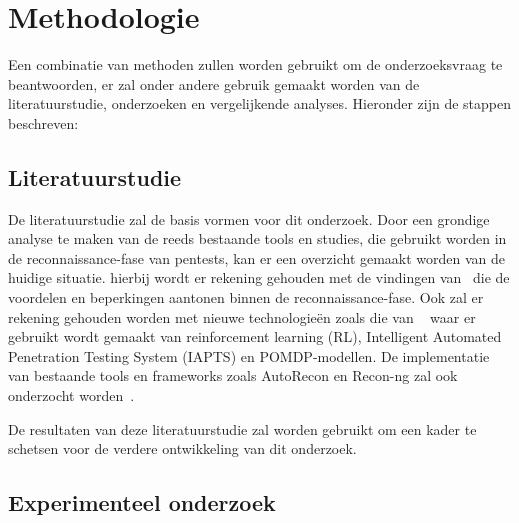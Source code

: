 


\section{Methodologie}%
\label{sec:methodologie}

Een combinatie van methoden zullen worden gebruikt om de onderzoeksvraag te beantwoorden, er zal onder andere gebruik
gemaakt worden van de literatuurstudie, onderzoeken en vergelijkende analyses. Hieronder zijn de stappen beschreven:

\subsection{Literatuurstudie}

De literatuurstudie zal de basis vormen voor dit onderzoek. Door een grondige analyse te maken van de reeds bestaande tools en studies,
die gebruikt worden in de reconnaissance-fase van pentests, kan er een overzicht gemaakt worden van de huidige situatie.
hierbij wordt er rekening gehouden met de vindingen van~\textcite{Shah,Kothia} die de voordelen en beperkingen aantonen binnen de reconnaissance-fase.
Ook zal er rekening gehouden worden met nieuwe technologieën zoals die van ~\textcite{Ghanem,Hoang} waar er gebruikt wordt gemaakt van
reinforcement learning (RL), Intelligent Automated Penetration Testing System (IAPTS) en POMDP-modellen. De implementatie van bestaande
tools en frameworks zoals AutoRecon en Recon-ng zal ook onderzocht worden~\autocite{Shebli}.

De resultaten van deze literatuurstudie zal worden gebruikt om een kader te schetsen voor de verdere ontwikkeling van dit onderzoek.

\subsection{Experimenteel onderzoek}

